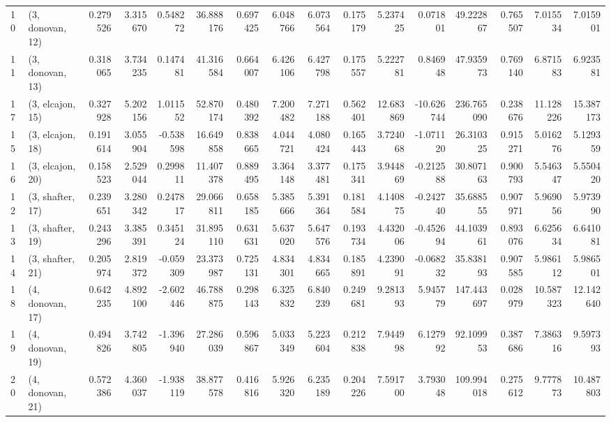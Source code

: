 \begin{tabular}{llrrrrrrrrrrrrrr}
10 &  (3, donovan, 12) &   0.279526 &  3.315670 &  0.548272 &  36.888176 &  0.697425 &   6.048766 &  6.073564 &  0.175179 &   5.237425 &   0.071801 &   49.222867 &  0.765507 &   7.015534 &   7.015901 \\
11 &  (3, donovan, 13) &   0.318065 &  3.734235 &  0.147481 &  41.316584 &  0.664007 &   6.426106 &  6.427798 &  0.175557 &   5.222781 &   0.846948 &   47.935973 &  0.769140 &   6.871583 &   6.923581 \\
17 &  (3, elcajon, 15) &   0.327928 &  5.202156 &  1.011552 &  52.870174 &  0.480392 &   7.200482 &  7.271188 &  0.562401 &  12.683869 & -10.626744 &  236.765090 &  0.238676 &  11.128226 &  15.387173 \\
15 &  (3, elcajon, 18) &   0.191614 &  3.055904 & -0.538598 &  16.649858 &  0.838665 &   4.044721 &  4.080424 &  0.165443 &   3.724068 &  -1.071120 &   26.310325 &  0.915271 &   5.016276 &   5.129359 \\
16 &  (3, elcajon, 20) &   0.158523 &  2.529044 &  0.299811 &  11.407378 &  0.889495 &   3.364148 &  3.377481 &  0.175341 &   3.944869 &  -0.212588 &   30.807163 &  0.900793 &   5.546347 &   5.550420 \\
12 &  (3, shafter, 17) &   0.239651 &  3.280342 &  0.247817 &  29.066811 &  0.658185 &   5.385666 &  5.391364 &  0.181584 &   4.140875 &  -0.242740 &   35.688555 &  0.907971 &   5.969056 &   5.973990 \\
13 &  (3, shafter, 19) &   0.243296 &  3.385391 &  0.345124 &  31.895110 &  0.631631 &   5.637020 &  5.647576 &  0.193734 &   4.432006 &  -0.452694 &   44.103961 &  0.893076 &   6.625634 &   6.641081 \\
14 &  (3, shafter, 21) &   0.205974 &  2.819372 & -0.059309 &  23.373987 &  0.725131 &   4.834301 &  4.834665 &  0.185891 &   4.239091 &  -0.068232 &   35.838193 &  0.907585 &   5.986112 &   5.986501 \\
18 &  (4, donovan, 17) &   0.642235 &  4.892100 & -2.602446 &  46.788875 &  0.298143 &   6.325832 &  6.840239 &  0.249681 &   9.281393 &   5.945779 &  147.443697 &  0.028979 &  10.587323 &  12.142640 \\
19 &  (4, donovan, 19) &   0.494826 &  3.742805 & -1.396940 &  27.286039 &  0.596867 &   5.033349 &  5.223604 &  0.212838 &   7.944998 &   6.127992 &   92.109953 &  0.387686 &   7.386316 &   9.597393 \\
20 &  (4, donovan, 21) &   0.572386 &  4.360037 & -1.938119 &  38.877578 &  0.416816 &   5.926320 &  6.235189 &  0.204226 &   7.591700 &   3.793048 &  109.994018 &  0.275612 &   9.777873 &  10.487803 \\

\end{tabular}
